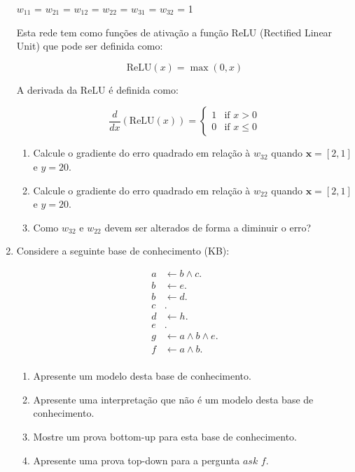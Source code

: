 \documentclass{article}
\begin{document}
\begin{enumerate}
    $w_{11}$ = $w_{21}$ = $w_{12}$ = $w_{22}$ = $w_{31}$ = $w_{32}$ = 1

    Esta rede tem como funções de ativação a função ReLU (Rectified Linear Unit) que pode ser definida como:

    \begin{equation}
        \text{ReLU}(x) = \max(0, x)
    \end{equation}

    A derivada da ReLU é definida como:

    \begin{equation}
            \frac{d}{dx}(\text{ReLU}(x)) =
            \begin{cases}
            1 & \text{if } x > 0 \\
            0 & \text{if } x \leq 0
            \end{cases}            
    \end{equation}


    \begin{enumerate}
        \item Calcule o gradiente do erro quadrado em relação à $w_{32}$ quando $\mathbf{x} = [2,1]$ e $y = 20$.
        \item Calcule o gradiente do erro quadrado em relação à $w_{22}$ quando $\mathbf{x} = [2,1]$ e $y = 20$. 
        \item Como $w_{32}$ e $w_{22}$ devem ser alterados de forma a diminuir o erro?   
    \end{enumerate}
    
    \item Considere a seguinte base de conhecimento (KB):
    \vspace{-0.5 cm}
    
    \begin{center}
        \begin{align*}
         a & \leftarrow b \wedge c. \\ 
         b & \leftarrow e. \\ 
         b & \leftarrow d. \\ 
         c &. \\ 
         d & \leftarrow h. \\ 
         e &. \\
         g & \leftarrow a \wedge b  \wedge e. \\
         f & \leftarrow a \wedge b. \\  
        \end{align*}
    \end{center}
    
    
    \begin{enumerate} 
        \item Apresente um modelo desta base de conhecimento.
        \item Apresente uma interpretação que não é um modelo desta base de conhecimento.
        \item Mostre um prova bottom-up para esta base de conhecimento. 
        \item Apresente uma prova top-down para a pergunta $ask$ $f$.
    \end{enumerate}
    
    \end{enumerate}
\end{document}
